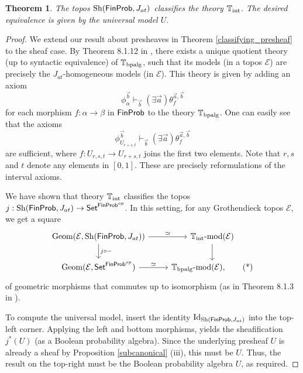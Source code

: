\documentclass[a4paper]{amsproc}
\theoremstyle{plain}
\newtheorem{theorem}{Theorem}[section]
\theoremstyle{definition}
\theoremstyle{remark}
\numberwithin{equation}{section}
\DeclareMathOperator{\Sh}{Sh}
\DeclareMathOperator{\Geom}{Geom}
\newcommand{\Set}{\textup{\textsf{Set}}}
\newcommand{\FinProb}{\textup{\textsf{FinProb}}}
\begin{document}
\begin{theorem} \label{classifying}
    The topos $\Sh(\FinProb,J_{at})$ classifies the theory $\mathbb{T}_{\textup{int}}$. The desired equivalence is given by the universal model $U$.
\end{theorem}

\begin{proof}
    We extend our result about presheaves in Theorem \ref{classifying_presheaf} to the sheaf case. By Theorem 8.1.12 in \cite{caramello2018theories}, there exists a unique quotient theory (up to syntactic equivalence) of $\mathbb{T}_{\textup{bpalg}}$, such that its models (in a topos $\mathcal{E}$) are precisely the $J_{at}$-homogeneous models (in $\mathcal{E}$).
    This theory is given by adding an axiom
    \[
    \phi_{\alpha}^{\vec{b}} \vdash_{\vec{b}} (\exists \vec{a}) \theta_f^{\vec{a},\vec{b}}
    \]
    for each morphism $f: \alpha \to \beta$ in $\FinProb$ to the theory $\mathbb{T}_{\textup{bpalg}}$. One can easily see that the axioms
    \[
    \phi_{U_{r+s,t}}^{\vec{b}} \vdash_{\vec{b}} (\exists \vec{a}) \theta_f^{\vec{a},\vec{b}}
    \]
    are sufficient, where $f: U_{r,s,t} \to U_{r+s,t}$ joins the first two elements. Note that $r,s$ and $t$ denote any elements in $[0,1]$. These are precisely reformulations of the interval axioms.

    We have shown that theory $\mathbb{T}_{\textup{int}}$ classifies the topos $j: \Sh(\FinProb, J_{at}) \to \Set^{\FinProb^{op}}$. In this setting, for any Grothendieck topos $\mathcal{E}$, we get a square
    \begin{equation}\label{geometric_com}
        \begin{tikzcd}
            \Geom(\mathcal{E},\Sh(\FinProb,J_{at})) \arrow[d, "j \circ -"] \arrow[r, "\simeq"] & {\mathbb{T}_{\textup{int}}\textup{-mod}(\mathcal{E})} \arrow[d] \\
            \Geom(\mathcal{E},\Set^{\FinProb^{op}}) \arrow[r, "\simeq"]         & {\mathbb{T}_{\textup{bpalg}}\textup{-mod}(\mathcal{E})}, \tag{*}
        \end{tikzcd}
    \end{equation}
    of geometric morphisms that commutes up to isomorphism (as in Theorem 8.1.3 in \cite{caramello2018theories}). 
    
    To compute the universal model, insert the identity $\textup{Id}_{\Sh(\FinProb,J_{at})}$ into the top-left corner. Applying the left and bottom morphisms, yields the sheafification $j^*(U)$ (as a Boolean probability algebra). Since the underlying presheaf $U$ is already a sheaf by Proposition \ref{subcanonical} (iii), this must be $U$. Thus, the result on the top-right must be the Boolean probability algebra $U$, as required.
\end{proof}
\end{document}
